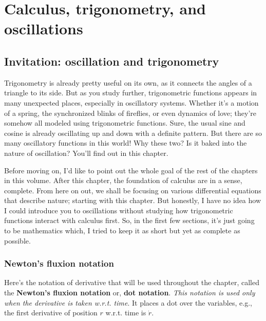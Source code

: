 \chapter{Calculus, trigonometry, and oscillations}
\label{sec:calculus-and-trigonometry}


\section{Invitation: oscillation and trigonometry}

Trigonometry is already pretty useful on its own, as it connects the angles of a triangle to its side. But as you study further, trigonometric functions appears in many unexpected places, especially in oscillatory systems. Whether it's a motion of a spring, the synchronized blinks of fireflies, or even dynamics of love; they're somehow all modeled using trigonometric functions. Sure, the usual sine and cosine is already oscillating up and down with a definite pattern. But there are so many oscillatory functions in this world! Why these two? Is it baked into the nature of oscillation? You'll find out in this chapter.

Before moving on, I'd like to point out the whole goal of the rest of the chapters in this volume. After this chapter, the foundation of calculus are in a sense, complete. From here on out, we shall be focusing on various differential equations that describe nature; starting with this chapter. But honestly, I have no idea how I could introduce you to oscillations without studying how trigonometric functions interact with calculus first. So, in the first few sections, it's just going to be mathematics which, I tried to keep it as short but yet as complete as possible.

\subsection{Newton's fluxion notation}
\label{sec:newton-fluxion}

Here's the notation of derivative that will be used throughout the chapter, called the \textbf{Newton's fluxion notation} or, \textbf{dot notation}. \emph{This notation is used only when the derivative is taken w.r.t. time}. It places a dot over the variables, e.g., the first derivative of position $r$ w.r.t. time is $\dot{r}$.

